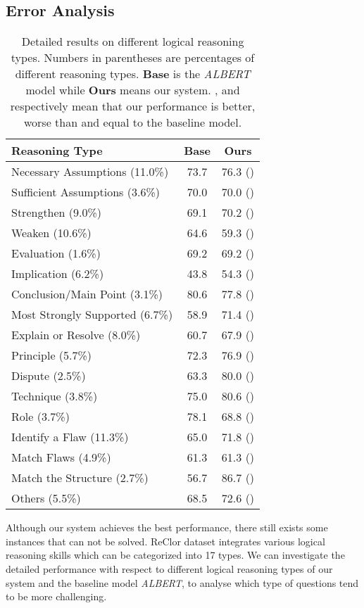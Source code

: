 \documentclass[11pt,a4paper]{article}
\begin{document}
\subsection{Error Analysis}
\begin{table}[!h]
    \setlength\tabcolsep{3pt}
\newcommand{\tabincell}[2]{\begin{tabular}{@{}#1@{}}#2\end{tabular}}
	\centering
	\begin{tabular}{lcc}
	\toprule
	\bf Reasoning Type & \bf Base & \bf Ours \\
	\midrule  				
	Necessary Assumptions (11.0\%)& 73.7 & 76.3 ()\\
	Sufficient Assumptions (3.6\%)& 70.0 & 70.0 ()\\
	Strengthen (9.0\%)& 69.1 & 70.2 ()\\
	Weaken (10.6\%)& 64.6 & 59.3 ()\\
	Evaluation (1.6\%)& 69.2 & 69.2 ()\\
	Implication (6.2\%)& 43.8 & 54.3 ()\\
	Conclusion/Main Point (3.1\%)& 80.6 & 77.8 ()\\
	Most Strongly Supported (6.7\%)& 58.9 & 71.4 ()\\
	Explain or Resolve (8.0\%)& 60.7 & 67.9 () \\
	Principle (5.7\%) & 72.3 & 76.9 ()\\ 
	Dispute (2.5\%) & 63.3 & 80.0 ()\\
	Technique (3.8\%) & 75.0 & 80.6 ()\\
    Role (3.7\%) & 78.1 & 68.8 ()\\
    Identify a Flaw (11.3\%) & 65.0 & 71.8 ()\\
    Match Flaws (4.9\%) & 61.3 & 61.3 ()\\
    Match the Structure (2.7\%) & 56.7 & 86.7 ()\\
    Others (5.5\%) & 68.5 & 72.6 ()\\
	\bottomrule
 	\end{tabular}
	\caption{Detailed results on different logical reasoning types. Numbers in parentheses are percentages of different reasoning types. \textbf{Base} is the \emph{ALBERT} model while \textbf{Ours} means our \emph{} system.
	,  and  respectively mean that our performance is better, worse than and equal to the baseline model.}
	\label{table_type}
\end{table}



Although our system achieves the best performance, there still exists some instances that can not be solved. 
ReClor dataset integrates various logical reasoning skills which can be categorized into 17 types. We can investigate the detailed performance with respect to different logical reasoning types of our system \emph{} and the baseline model \emph{ALBERT}, to analyse which type of questions tend to be more challenging.
\end{document}
